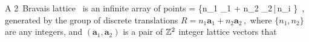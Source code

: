 

A 2\dmn\ {Bravais lattice} \lattice\ is an infinite array of points
\beq
\lattice = \{n_1 _1 + n_2 _2\,|\,n_i \in {}\}
\,,
generated by the group of discrete translations
\(
{R} =n_{1}\mathbf{a}_{1}+n_{2}\mathbf{a}_{2}
\,,
\)
where $\{n_{1},n_{2}\}$ are any integers, and
$(\mathbf{a}_{1},\mathbf{a}_{2})$ is a pair of $\mathbb{Z}^2$ integer
lattice vectors that
